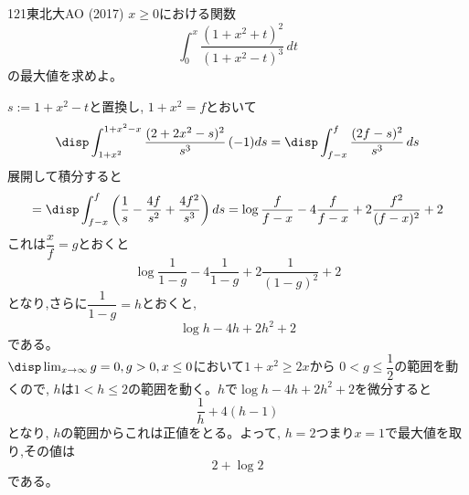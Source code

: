 \begin{prob}{121}{}{東北大AO (2017)}
 $x \geq 0$における関数
 \[ \int_0^x\! \frac{(1+x^2+t)^2}{(1+x^2-t)^3} \,dt \]
 の最大値を求めよ。
\end{prob}

$s:=1+x^2-t$と置換し, $1+x^2=f$とおいて
\[\disp\int_{1+x^2}^{1+x^2-x} \dfrac{(2+2x^2-s)^2}{s^3} \,(-1)ds=\disp\int_{f-x}^{f} \dfrac{(2f-s)^2}{s^3} \,ds \]
展開して積分すると
\[=\disp\int_{f-x}^{f}\left(\dfrac{1}{s} -\dfrac{4f}{s^2}+\dfrac{4f^2}{s^3}\right)ds=\log{\dfrac{f}{f-x}}-4\dfrac{f}{f-x} +2\dfrac{f^2}{(f-x)^2}+2\]
これは$\dfrac{x}{f}=g$とおくと
\[\log{\dfrac{1}{1-g}}-4\dfrac{1}{1-g}+2\dfrac{1}{(1-g)^2}+2\]
となり,さらに$\dfrac{1}{1-g}=h$とおくと,
\[\log{h}-4h+2h^2+2\]
である。\\
$\disp\lim_{x\to\infty}g=0, g>0, x\leq 0$において$1+x^2\geq 2x$から $0<g\leq\dfrac{1}{2}$の範囲を動くので, $h$は$1<h\leq 2$の範囲を動く。$h$で$\log{h}-4h+2h^2+2$を微分すると
\[\dfrac{1}{h}+4(h-1)\]
となり, $h$の範囲からこれは正値をとる。よって, $h=2$つまり$x=1$で最大値を取り,その値は
\[2+\log{2}\]
である。
